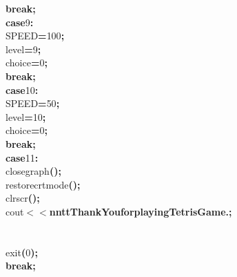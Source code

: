 \documentclass[a4paper, 10pt]{article}
\newcommand\SPC{\hspace*{0.6em}}
\newcommand\BS{\mbox{\char 92}}
\newcommand\QOT{\mbox{\char 34}}
\newcommand{\CppAIdentifier}[1]{#1}
\newcommand{\CppANumber}[1]{\textcolor[rgb]{0.5,0,0.5}{#1}}
\newcommand{\CppAReservedWord}[1]{\textbf{#1}}
\newcommand{\CppASpace}[1]{\colorbox[rgb]{1,1,1}{#1}}
\newcommand{\CppAString}[1]{\textbf{\textcolor[rgb]{0,0,1}{#1}}}
\newcommand{\CppASymbol}[1]{\textbf{\textcolor[rgb]{1,0,0}{#1}}}
\begin{document}
\begin{ttfamily}
\CppASpace{\SPC \SPC \SPC \SPC }\CppAReservedWord{break}\CppASymbol{;}\\
\CppASpace{\SPC \SPC \SPC \SPC }\CppAReservedWord{case}\CppASpace{\SPC }\CppANumber{9}\CppASymbol{:}\\
\CppASpace{\SPC \SPC \SPC \SPC }\CppAIdentifier{SPEED}\CppASymbol{=}\CppANumber{100}\CppASymbol{;}\\
\CppASpace{\SPC \SPC \SPC \SPC }\CppAIdentifier{level}\CppASymbol{=}\CppANumber{9}\CppASymbol{;}\\
\CppASpace{\SPC \SPC \SPC \SPC }\CppAIdentifier{choice}\CppASymbol{=}\CppANumber{0}\CppASymbol{;}\\
\CppASpace{\SPC \SPC \SPC \SPC }\CppAReservedWord{break}\CppASymbol{;}\\
\CppASpace{\SPC \SPC \SPC \SPC }\CppAReservedWord{case}\CppASpace{\SPC }\CppANumber{10}\CppASymbol{:}\\
\CppASpace{\SPC \SPC \SPC \SPC }\CppAIdentifier{SPEED}\CppASymbol{=}\CppANumber{50}\CppASymbol{;}\\
\CppASpace{\SPC \SPC \SPC \SPC }\CppAIdentifier{level}\CppASymbol{=}\CppANumber{10}\CppASymbol{;}\\
\CppASpace{\SPC \SPC \SPC \SPC }\CppAIdentifier{choice}\CppASymbol{=}\CppANumber{0}\CppASymbol{;}\\
\CppASpace{\SPC \SPC \SPC \SPC }\CppAReservedWord{break}\CppASymbol{;}\\
\CppASpace{\SPC \SPC \SPC \SPC }\CppAReservedWord{case}\CppASpace{\SPC }\CppANumber{11}\CppASymbol{:}\\
\CppASpace{\SPC \SPC \SPC \SPC }\CppAIdentifier{closegraph}\CppASymbol{(}\CppASymbol{)}\CppASymbol{;}\\
\CppASpace{\SPC \SPC \SPC \SPC }\CppAIdentifier{restorecrtmode}\CppASymbol{(}\CppASymbol{)}\CppASymbol{;}\\
\CppASpace{\SPC \SPC \SPC \SPC }\CppAIdentifier{clrscr}\CppASymbol{(}\CppASymbol{)}\CppASymbol{;}\\
\CppASpace{\SPC \SPC \SPC \SPC }\CppAIdentifier{cout}\CppASymbol{$<$$<$}\CppAString{\QOT \BS n\BS n\BS t\BS t\SPC Thank\SPC You\SPC for\SPC playing\SPC Tetris\SPC Game.\QOT }\CppASymbol{;}\\
\\
\\
\CppASpace{\SPC \SPC \SPC \SPC }\CppAIdentifier{exit}\CppASymbol{(}\CppANumber{0}\CppASymbol{)}\CppASymbol{;}\\
\CppASpace{\SPC \SPC \SPC \SPC }\CppAReservedWord{break}\CppASymbol{;}\\

\end{ttfamily}
\end{document}
